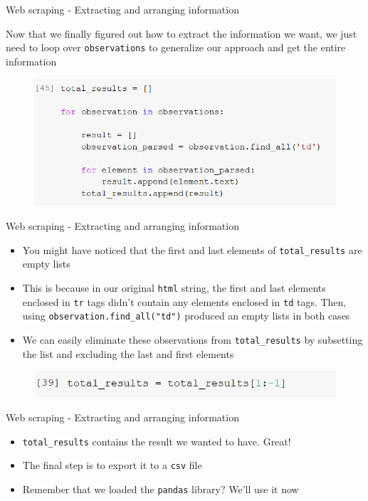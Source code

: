 \documentclass[aspectratio=169]{beamer}
\begin{document}
\begin{frame}{Web scraping - Extracting and arranging information}

	Now that we finally figured out how to extract the information we want, we just need to loop over \texttt{observations} to generalize our approach and get the entire information

	\begin{figure}
		\centering
		\includegraphics[width=0.6\linewidth]{img/tr_loop.png}
	\end{figure}

\end{frame}

\begin{frame}{Web scraping - Extracting and arranging information}

	\begin{itemize}	
		\item You might have noticed that the first and last elements of \texttt{total\_results} are empty lists
		\item This is because in our original \texttt{html} string, the first and last elements enclosed in \texttt{tr} tags didn't contain any elements enclosed in \texttt{td} tags. Then, using \texttt{observation.find\_all("td")} produced an empty lists in both cases
		\item We can easily eliminate these observations from \texttt{total\_results} by subsetting the list and excluding the last and first elements
	\end{itemize}

	\begin{figure}
		\centering
		\includegraphics[width=0.6\linewidth]{img/total_results_subsetting.png}
	\end{figure}

\end{frame}

\begin{frame}{Web scraping - Extracting and arranging information}

	\begin{itemize}
		\item \texttt{total\_results} contains the result we wanted to have. Great!
		\item The final step is to export it to a \texttt{csv} file
		\item Remember that we loaded the \texttt{pandas} library? We'll use it now
	\end{itemize}

\end{frame}
\end{document}
